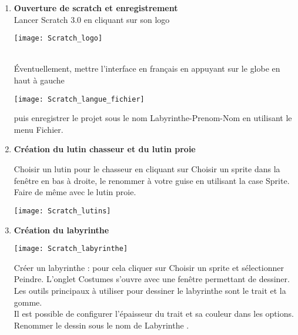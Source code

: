       \begin{enumerate}
         \item {\bf Ouverture de scratch et enregistrement} \pfh{} \\ [1mm]
            Lancer \textcolor{B1}{Scratch 3.0} en cliquant sur son logo \parbox{1cm}{\texttt{[image: Scratch\_logo]}} \\
            Éventuellement, mettre l'interface en français en appuyant sur le \textcolor{B1}{globe} en haut à gauche \parbox{2.5cm}{\texttt{[image: Scratch\_langue\_fichier]}} puis enregistrer le projet sous le nom \og Labyrinthe-Prenom-Nom \fg{} en utilisant le menu \textcolor{B1}{Fichier}. \\
   
         \item {\bf Création du lutin chasseur et du lutin proie} \pfh{} \\ 
            \begin{minipage}{8cm}
               Choisir un lutin pour le chasseur en cliquant sur \textcolor{B1}{Choisir un sprite} dans la fenêtre en bas à droite, le renommer à votre guise en utilisant la case \textcolor{B1}{Sprite}. \\
               Faire de même avec le lutin proie.
            \end{minipage}
            \qquad
            \begin{minipage}{7cm}
               \texttt{[image: Scratch\_lutins]}
            \end{minipage}
   
\pagebreak

         \item {\bf Création du labyrinthe} \pfh{} \\ 
            \begin{minipage}{9cm}
               \texttt{[image: Scratch\_labyrinthe]}
            \end{minipage}
            \qquad
            \begin{minipage}{6cm}
               Créer un labyrinthe : pour cela cliquer sur \textcolor{B1}{Choisir un sprite} et sélectionner \textcolor{B1}{Peindre}. L'onglet \textcolor{B1}{Costumes} s'ouvre avec une fenêtre permettant de dessiner. \\
               Les outils principaux à utiliser pour dessiner le labyrinthe sont le \textcolor{B1}{trait} et la \textcolor{B1}{gomme}. \\
               Il est possible de configurer l'épaisseur du trait et sa couleur dans les options. \\
               Renommer le dessin sous le nom de \og Labyrinthe \fg.
            \end{minipage}
      \end{enumerate}
   
